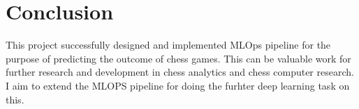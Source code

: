 \chapter{Conclusion}
\label{ch:conclusion-recommendation-future}
This project successfully designed and implemented MLOps pipeline for the purpose of predicting the outcome of chess games. This can be valuable work for further research and development in chess analytics and chess computer research. I aim to extend the MLOPS pipeline for doing the furhter deep learning task on this. 
